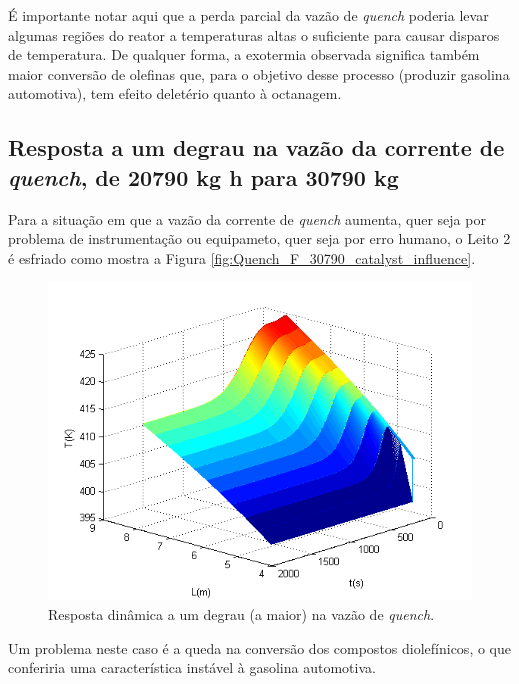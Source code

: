 É importante notar aqui que a perda parcial da vazão de \emph{quench} poderia
levar algumas regiões do reator a temperaturas altas o suficiente para causar
disparos de temperatura. De qualquer forma, a exotermia observada significa
também maior conversão de olefinas que, para o objetivo desse processo (produzir
gasolina automotiva), tem efeito deletério quanto à octanagem.

\subsection{Resposta a um degrau na vazão da corrente de \emph{quench}, de 20790
kg h para 30790 kg} \label{sec:respostaaumdegrauvazao3}

Para a situação em que a vazão da corrente de \emph{quench} aumenta, quer seja
por problema de instrumentação ou equipameto, quer seja por erro humano, o Leito
2 é esfriado como mostra a Figura \autoref{fig:Quench_F_30790_catalyst_influence}.

\begin{figure}[htb]
\centering
\includegraphics[scale=0.8]{images/Chap4/Quench_F_30790_catalyst_influence.png}
\caption{Resposta dinâmica a um degrau (a maior) na vazão de \emph{quench}.}
\label{fig:Quench_F_30790_catalyst_influence}
\end{figure}

Um problema neste caso é a queda na conversão dos compostos diolefínicos, o
que conferiria uma característica instável à gasolina automotiva.